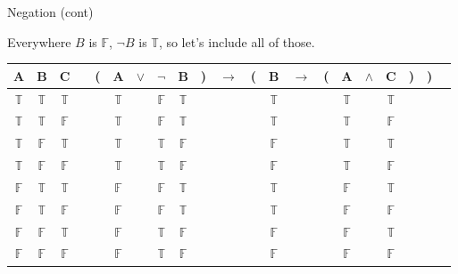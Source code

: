 \documentclass[
  ignorenonframetext,
]{beamer}
\renewcommand{\,}{\text{, }}
\def\True{\mathbb{T}}
\def\False{\mathbb{F}}
\begin{document}
\begin{frame}{Negation (cont)}
\protect\hypertarget{negation-cont}{}

Everywhere \(B\) is \(\False\), \(\neg B\) is \(\True\), so let's
include all of those.

\begin{center}
\bigskip
\begin{tabular}{@{ }c@{ }@{ }c@{ }@{ }c | c@{ }@{}c@{}@{ }c@{ }@{ }c@{ }@{ }c@{ }@{ }c@{ }@{}c@{}@{ }c@{ }@{}c@{}@{ }c@{ }@{ }c@{ }@{}c@{}@{ }c@{ }@{ }c@{ }@{ }c@{ }@{}c@{}@{}c@{}@{ }c}
A & B & C &  & ( & A & $\vee$ & $\neg$ & B & ) & $\rightarrow$ & ( & B & $\rightarrow$ & ( & A & $\wedge$ & C & ) & ) & \\
\hline 
 $\True$ & $\True$ & $\True$ &  &  & $\True$ && $\False$ & $\True$ &  &&  & $\True$ &&  & $\True$ && $\True$ &  &  & \\
 $\True$ & $\True$ & $\False$ &  &  & $\True$ && $\False$ & $\True$ &  &&  & $\True$ &&  & $\True$ && $\False$ &  &  & \\
 $\True$ & $\False$ & $\True$ &  &  & $\True$ && $\True$ & $\False$ &  &&  & $\False$ &&  & $\True$ && $\True$ &  &  & \\
 $\True$ & $\False$ & $\False$ &  &  & $\True$ && $\True$ & $\False$ &  &&  & $\False$ &&  & $\True$ && $\False$ &  &  & \\
 $\False$ & $\True$ & $\True$ &  &  & $\False$ && $\False$ & $\True$ &  &&  & $\True$ &&  & $\False$ && $\True$ &  &  & \\
 $\False$ & $\True$ & $\False$ &  &  & $\False$ && $\False$ & $\True$ &  &&  & $\True$ &&  & $\False$ && $\False$ &  &  & \\
 $\False$ & $\False$ & $\True$ &  &  & $\False$ && $\True$ & $\False$ &  &&  & $\False$ &&  & $\False$ && $\True$ &  &  & \\
 $\False$ & $\False$ & $\False$ &  &  & $\False$ && $\True$ & $\False$ &  &&  & $\False$ &&  & $\False$ && $\False$ &  &  & \\
\end{tabular}
\bigskip
\end{center}

\end{frame}
\end{document}

